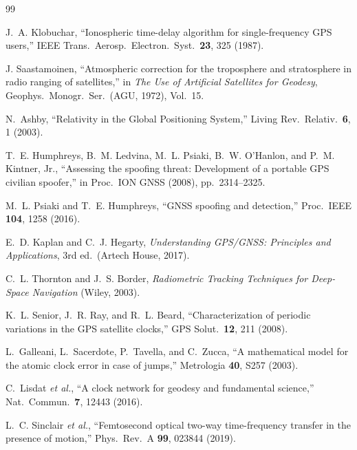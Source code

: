 \documentclass[aps,prd,twocolumn,superscriptaddress,nofootinbib]{revtex4-2}
\begin{document}
\begin{thebibliography}{99}

J.~A. Klobuchar,
``Ionospheric time-delay algorithm for single-frequency GPS users,''
IEEE Trans.\ Aerosp.\ Electron.\ Syst.\ \textbf{23}, 325 (1987).

J. Saastamoinen,
``Atmospheric correction for the troposphere and stratosphere in radio
ranging of satellites,''
in \textit{The Use of Artificial Satellites for Geodesy},
Geophys.\ Monogr.\ Ser.\ (AGU, 1972), Vol.~15.

N.~Ashby,
``Relativity in the Global Positioning System,''
Living Rev.\ Relativ.\ \textbf{6}, 1 (2003).

T.~E. Humphreys, B.~M. Ledvina, M.~L. Psiaki, B.~W. O'Hanlon, and
P.~M. Kintner, Jr.,
``Assessing the spoofing threat: Development of a portable GPS civilian
spoofer,''
in Proc.\ ION GNSS (2008), pp.\ 2314--2325.

M.~L. Psiaki and T.~E. Humphreys,
``GNSS spoofing and detection,''
Proc.\ IEEE \textbf{104}, 1258 (2016).

E.~D. Kaplan and C.~J. Hegarty,
\textit{Understanding GPS/GNSS: Principles and Applications},
3rd ed.\ (Artech House, 2017).

C.~L. Thornton and J.~S. Border,
\textit{Radiometric Tracking Techniques for Deep-Space Navigation}
(Wiley, 2003).

K.~L. Senior, J.~R. Ray, and R.~L. Beard,
``Characterization of periodic variations in the GPS satellite clocks,''
GPS Solut.\ \textbf{12}, 211 (2008).

L.~Galleani, L.~Sacerdote, P.~Tavella, and C.~Zucca,
``A mathematical model for the atomic clock error in case of jumps,''
Metrologia \textbf{40}, S257 (2003).

C.~Lisdat \textit{et al.},
``A clock network for geodesy and fundamental science,''
Nat.\ Commun.\ \textbf{7}, 12443 (2016).

L.~C. Sinclair \textit{et al.},
``Femtosecond optical two-way time-frequency transfer in the
presence of motion,''
Phys.\ Rev.\ A \textbf{99}, 023844 (2019).


\end{thebibliography}
\end{document}
